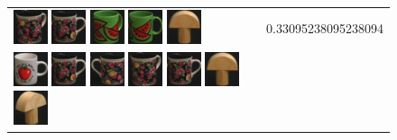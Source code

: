 \begin{figure}[tbp]
\begin{center}
\begin{tabular}{m{11cm} | m{3cm} |}
\includegraphics[width=1cm]{coil/beeld-63.eps}
\includegraphics[width=1cm]{coil/beeld-60.eps}
\includegraphics[width=1cm]{coil/beeld-33.eps}
\includegraphics[width=1cm]{coil/beeld-30.eps}
\includegraphics[width=1cm]{coil/beeld-1.eps}
& {\scriptsize 0.33095238095238094}
\\
\includegraphics[width=1cm]{coil/beeld-36.eps}
\includegraphics[width=1cm]{coil/beeld-60.eps}
\includegraphics[width=1cm]{coil/beeld-61.eps}
\includegraphics[width=1cm]{coil/beeld-63.eps}
\includegraphics[width=1cm]{coil/beeld-60.eps}
\includegraphics[width=1cm]{coil/beeld-1.eps}
\includegraphics[width=1cm]{coil/beeld-3.eps}

\end{tabular}
\end{center}
\end{figure}
